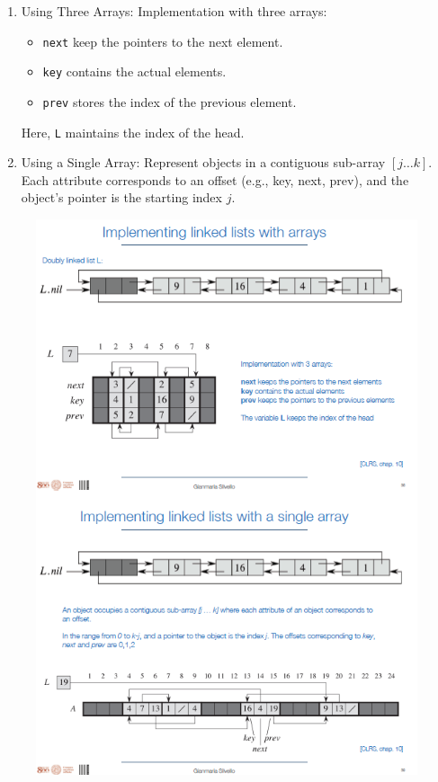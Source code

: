    \begin{enumerate}
        \item  Using Three Arrays: Implementation with three arrays:
                   \begin{itemize}
                       \item \texttt{next} keep the pointers to the next element.
                       \item \texttt{key} contains the actual elements.
                       \item \texttt{prev} stores the index of the previous element.
                   \end{itemize}
                Here, \texttt{L} maintains the index of the head.
        \item Using a Single Array: Represent objects in a contiguous sub-array \([j \dots k]\). Each attribute corresponds to an offset (e.g., key, next, prev), and the object's pointer is the starting index \(j\).
    \end{enumerate}
    \begin{figure}
        \centering
        \includegraphics[width=1\linewidth]{immagini/listarray.png}
        \label{fig:enter-label}
    \end{figure}
    
    

    
    

